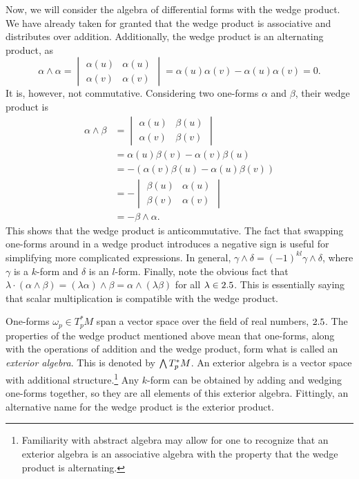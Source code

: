 \documentclass[a4paper,12pt]{article}
\begin{document}
Now, we will consider the algebra of differential forms with the wedge product.
We have already taken for granted that the wedge product is associative and distributes over addition.
Additionally, the wedge product is an alternating product, as
\begin{equation*}
    \alpha \wedge \alpha = \begin{vmatrix}
    \alpha(u) & \alpha(u) \\
    \alpha(v) & \alpha(v)
    \end{vmatrix}
    = \alpha(u)\alpha(v) - \alpha(u)\alpha(v) = 0.
\end{equation*}
It is, however, not commutative.
Considering two one-forms $\alpha$ and $\beta$, their wedge product is
\begin{align*}
    \alpha \wedge \beta &= \begin{vmatrix}
    \alpha(u) & \beta(u) \\
    \alpha(v) & \beta(v)
    \end{vmatrix} \\
    &= \alpha(u)\beta(v) - \alpha(v)\beta(u) \\
    &= - (\alpha(v)\beta(u) - \alpha(u)\beta(v)) \\
    &= - \begin{vmatrix}
    \beta(u) & \alpha(u) \\
    \beta(v) & \alpha(v)
    \end{vmatrix} \\
    &= - \beta \wedge \alpha.
\end{align*}
This shows that the wedge product is anticommutative.
The fact that swapping one-forms around in a wedge product introduces a negative sign is useful for simplifying more complicated expressions.
In general, $\gamma \wedge \delta = (-1)^{kl} \gamma \wedge \delta$, where $\gamma$ is a $k$-form and $\delta$ is an $l$-form.
Finally, note the obvious fact that $\lambda \cdot (\alpha \wedge \beta) = (\lambda \alpha) \wedge \beta = \alpha \wedge (\lambda \beta)$ for all $\lambda \in 2.5$.
This is essentially saying that scalar multiplication is compatible with the wedge product.

One-forms $\omega_p \in T^*_p M$ span a vector space over the field of real numbers, $2.5$.
The properties of the wedge product mentioned above mean that one-forms, along with the operations of addition and the wedge product, form what is called an \emph{exterior algebra}.
This is denoted by $\extp T^*_p M$.
An exterior algebra is a vector space with additional structure.\footnote{Familiarity with abstract algebra may allow for one to recognize that an exterior algebra is an associative algebra with the property that the wedge product is alternating.}
Any $k$-form can be obtained by adding and wedging one-forms together, so they are all elements of this exterior algebra.
Fittingly, an alternative name for the wedge product is the exterior product.
\end{document}
